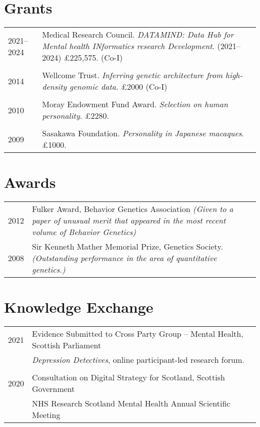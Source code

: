\documentclass[11pt]{article}
\begin{document}
\section*{Grants}

\begin{tabular}{p{3cm}p{12cm}}

2021--2024 & Medical Research Council. \emph{DATAMIND: Data Hub for Mental health INformatics research Development}. (2021--2024) £225,575. (Co-I) \\ \\

2014 & Wellcome Trust. \emph{Inferring genetic architecture from high-density genomic data.} £2000 (Co-I) \\ \\

2010 & Moray Endowment Fund Award. \emph{Selection on human personality}. £2280. \\ \\

2009 & Sasakawa Foundation. \emph{Personality in Japanese macaques}. £1000.

\end{tabular}

\section*{Awards}

\begin{tabular}{p{3cm}p{12cm}}

2012 & Fulker Award, Behavior Genetics Association \emph{(Given to a paper of unusual merit that appeared in the most recent volume of Behavior Genetics)} \\
2008 & Sir Kenneth Mather Memorial Prize, Genetics Society. \emph{(Outstanding performance in the area of quantitative genetics.)}

\end{tabular}


\section*{Knowledge Exchange}

\begin{tabular}{p{3cm}p{12cm}}

2021 & Evidence Submitted to Cross Party Group -- Mental Health, Scottish Parliament \\
      & \emph{Depression Detectives}, online participant-led research forum.\\ \\
2020 & Consultation on Digital Strategy for Scotland, Scottish Government \\
     & NHS Research Scotland Mental Health Annual Scientific Meeting \\

\end{tabular}
\end{document}

